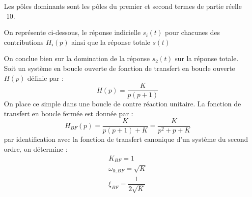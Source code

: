 Les pôles dominants sont les pôles du premier et second termes de partie 
réelle -10.
\begin{center}
    
\end{center}
On représente ci-dessous,
le réponse indicielle $s_i(t)$ pour chacunes des contributions
$H_i(p)$ ainsi que la réponse totale $s(t)$
\begin{center}
    
\end{center}
On conclue bien sur la domination de la réponse $s_2(t)$ sur la réponse totale.
\clearpage
Soit un système en boucle ouverte de fonction de transfert en 
boucle ouverte $H(p)$ définie  par :
\[
H(p)=\dfrac{K}{p(p+1)}
\]
On place ce simple dans une boucle de contre réaction unitaire.
La fonction de transfert en boucle fermée est donnée par :
\[
H_{BF}(p)=\dfrac{K}{p(p+1)+K}=\dfrac{K}{p^2+p+K}
\]
par identification avec la fonction de transfert canonique d'un système 
du second ordre, on détermine :
\begin{align*}
K_{BF}=1\\
\omega_{0,BF}=\sqrt{K}\\
\xi_{BF}=\dfrac{1}{2\sqrt{K}}\\
\end{align*}
